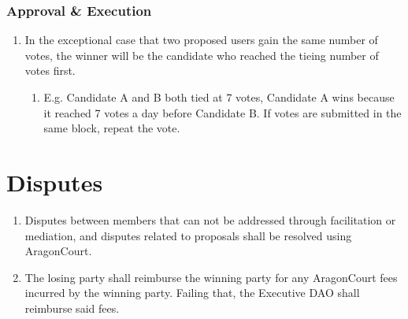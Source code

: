 \subsubsection*{Approval \& Execution}
\begin{enumerate}
	\item In the exceptional case that two proposed users gain the same number of votes, the winner will be the candidate who reached the tieing number of votes first.
	\begin{enumerate}
		\item E.g. Candidate A and B both tied at 7 votes, Candidate A wins because it reached 7 votes a day before Candidate B.
		If votes are submitted in the same block, repeat the vote.
	\end{enumerate}

\end{enumerate}


\section{Disputes}

\begin{enumerate}
	\item Disputes between members that can not be addressed through facilitation or mediation, and disputes related to proposals shall be resolved using \gls{AragonCourt}.
	\item The losing party shall reimburse the winning party for any \gls{AragonCourt} fees incurred by the winning party. Failing that, the Executive \ac{DAO} shall reimburse said fees.
\end{enumerate}

